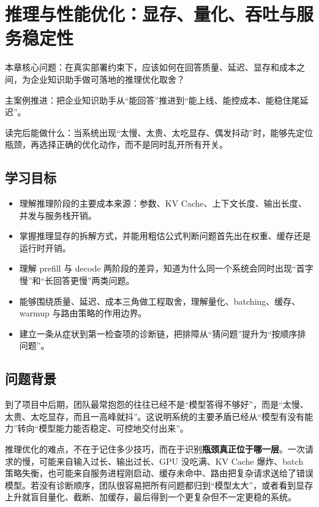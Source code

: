 \chapter{推理与性能优化：显存、量化、吞吐与服务稳定性}

\begin{introduction}
\item {\heiti 本章核心问题}：在真实部署约束下，应该如何在回答质量、延迟、显存和成本之间，为企业知识助手做可落地的推理优化取舍？
\item {\heiti 主案例推进}：把企业知识助手从“能回答”推进到“能上线、能控成本、能稳住尾延迟”。
\item {\heiti 读完后能做什么}：当系统出现“太慢、太贵、太吃显存、偶发抖动”时，能够先定位瓶颈，再选择正确的优化动作，而不是同时乱开所有开关。
\end{introduction}

\section{学习目标}
\begin{itemize}
  \item 理解推理阶段的主要成本来源：参数、KV Cache、上下文长度、输出长度、并发与服务栈开销。
  \item 掌握推理显存的拆解方式，并能用粗估公式判断问题首先出在权重、缓存还是运行时开销。
  \item 理解 prefill 与 decode 两阶段的差异，知道为什么同一个系统会同时出现“首字慢”和“长回答更慢”两类问题。
  \item 能够围绕质量、延迟、成本三角做工程取舍，理解量化、batching、缓存、warmup 与路由策略的作用边界。
  \item 建立一条从症状到第一检查项的诊断链，把排障从“猜问题”提升为“按顺序排问题”。
\end{itemize}

\section{问题背景}
到了项目中后期，团队最常抱怨的往往已经不是“模型答得不够好”，而是“太慢、太贵、太吃显存，而且一高峰就抖”。这说明系统的主要矛盾已经从“模型有没有能力”转向“模型能力能否稳定、可控地交付出来”。

推理优化的难点，不在于记住多少技巧，而在于识别\textbf{瓶颈真正位于哪一层}。一次请求的慢，可能来自输入过长、输出过长、GPU 没吃满、KV Cache 爆炸、batch 策略失衡，也可能来自服务进程刚启动、缓存未命中、路由把复杂请求送给了错误模型。若没有诊断顺序，团队很容易把所有问题都归到“模型太大”，或者看到显存上升就盲目量化、截断、加缓存，最后得到一个更复杂但不一定更稳的系统。

